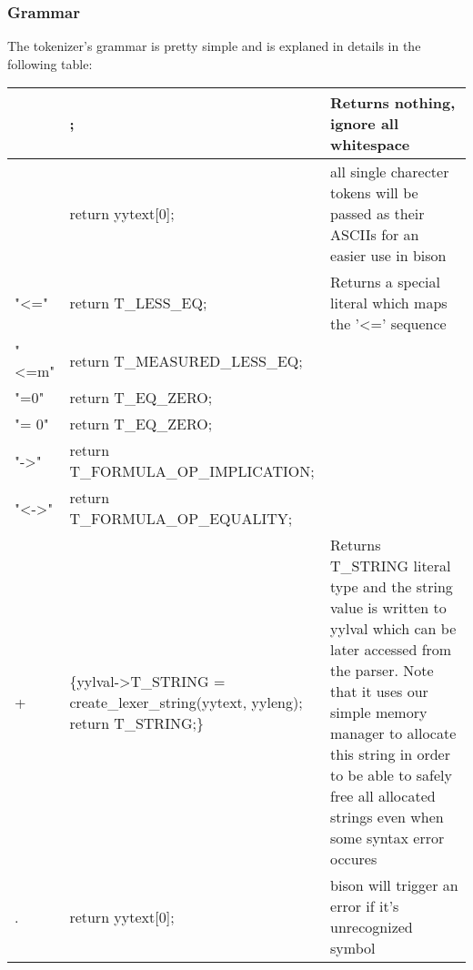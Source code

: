 \documentclass{article}
\begin{document}
	\subsubsection*{Grammar}
		The tokenizer's grammar is pretty simple and is explaned in details in the following table:
		\begin{flushleft}
			\begin{tabular}{ | m{7em} | m{15em}| m{10em} | } 
				\hline
					[ \textbackslash t \textbackslash  n] & ; & Returns nothing, ignore all whitespace \\ 
				\hline
					[,TF01()C\&|~*+-] 	& {return yytext[0];} & all single charecter tokens will be passed as their ASCIIs for an easier use in bison \\
				\hline
				    "<="            &   {return T\_LESS\_EQ;} & Returns a special literal which maps the '<=' sequence \\
				\hline
				    "<=m"           &   {return T\_MEASURED\_LESS\_EQ;} & \\
				\hline
				    "=0"            &   {return T\_EQ\_ZERO;} & \\
				\hline
				    "= 0"           &   {return T\_EQ\_ZERO;} & \\
				\hline
				    "->"            &   {return T\_FORMULA\_OP\_IMPLICATION;} & \\
				\hline
				    "<->"           &   {return T\_FORMULA\_OP\_EQUALITY;} & \\
				\hline
				    [a-zA-Z0-9]+    &   \makecell{\{yylval->T\_STRING =\\ create\_lexer\_string(yytext, yyleng); \\ return T\_STRING;\}} & Returns T\_STRING literal type and the string  value is written to yylval which can be later accessed from the parser. Note that it uses our simple memory manager to allocate this string in order to be able to safely free all allocated strings even when some syntax error occures \\
				\hline
				    .               &   {return yytext[0];} & bison will trigger an error if it's unrecognized symbol \\
				\hline

			\end{tabular}
		\end{flushleft}
\end{document}
